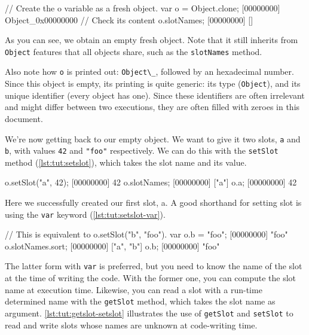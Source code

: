 \begin{urbiscript}[caption=Instanciating a new object,
  label=lst:tut:object-new, name=object-slots]
// Create the o variable as a fresh object.
var o = Object.clone;
[00000000] Object_0x00000000
// Check its content
o.slotNames;
[00000000] []
\end{urbiscript}

As you can see, we obtain an empty fresh object. Note that it still
inherits from \lstinline{Object} features that all objects share, such as
the \lstinline{slotNames} method.

Also note how \lstinline{o} is printed out: \lstinline{Object\_}, followed by an
hexadecimal number. Since this object is empty, its printing is quite
generic: its type (\lstinline{Object}), and its unique identifier (every
\us object has one). Since these identifiers are often irrelevant
and might differ between two executions, they are often filled with
zeroes in this document.

We're now getting back to our empty object. We want to give it two
slots, \lstinline{a} and \lstinline{b}, with values \lstinline|42| and
\lstinline|"foo"| respectively. We can do this with the
\lstinline{setSlot} method (\autoref{lst:tut:setslot}), which takes the slot name and
its value.

\begin{urbiscript}[caption=Defining slots, label=lst:tut:setslot,
  name=object-slots]
o.setSlot("a", 42);
[00000000] 42
o.slotNames;
[00000000] ["a"]
o.a;
[00000000] 42
\end{urbiscript}

Here we successfully created our first slot, a. A good shorthand for
setting slot is using the \lstinline{var} keyword (\autoref{lst:tut:setslot-var}).

\begin{urbiscript}[caption=Defining slots with var,
  label=lst:tut:setslot-var, name=object-slots]
// This is equivalent to o.setSlot("b", "foo").
var o.b = "foo";
[00000000] "foo"
o.slotNames.sort;
[00000000] ["a", "b"]
o.b;
[00000000] "foo"
\end{urbiscript}

The latter form with \lstinline{var} is preferred, but you need to know
the name of the slot at the time of writing the code. With the former
one, you can compute the slot name at execution time. Likewise, you
can read a slot with a run-time determined name with the
\lstinline{getSlot} method, which takes the slot name as
argument. \autoref{lst:tut:getslot-setslot} illustrates the use of
\lstinline{getSlot} and \lstinline{setSlot} to read and write slots whose
names are unknown at code-writing time.


